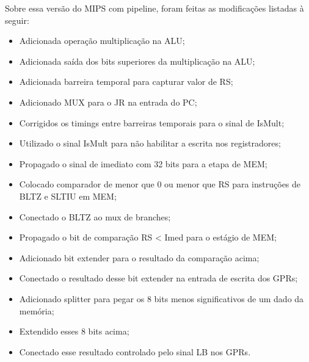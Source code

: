 \documentclass{report}
\begin{document}
        Sobre essa versão do MIPS com pipeline, foram feitas as modificações listadas à seguir:
        \begin{itemize}
            \item Adicionada operação multiplicação na ALU;
            \item Adicionada saída dos bits superiores da multiplicação na ALU;
            \item Adicionada barreira temporal para capturar valor de RS;
            \item Adicionado MUX para o JR na entrada do PC;
            \item Corrigidos os timings entre barreiras temporais para o sinal de IsMult;
            \item Utilizado o sinal IsMult para não habilitar a escrita nos registradores;
            \item Propagado o sinal de imediato com 32 bits para a etapa de MEM;
            \item Colocado comparador de menor que 0 ou menor que RS para instruções de BLTZ e SLTIU em MEM;
            \item Conectado o BLTZ ao mux de branches;
            \item Propagado o bit de comparação RS < Imed para o estágio de MEM;
            \item Adicionado bit extender para o resultado da comparação acima;
            \item Conectado o resultado desse bit extender na entrada de escrita dos GPRs;
            \item Adicionado splitter para pegar os 8 bits menos significativos de um dado da memória;
            \item Extendido esses 8 bits acima;
            \item Conectado esse resultado controlado pelo sinal LB nos GPRs.
        \end{itemize}
\end{document}
